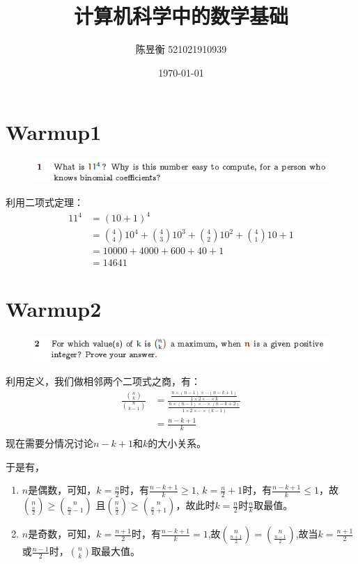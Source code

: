 \documentclass[]{article}
\title{计算机科学中的数学基础}
\author{陈昱衡 521021910939}
\date{\today}
\begin{document}
\maketitle


\section*{Warmup1}
\begin{figure}[H]
    \includegraphics[scale = 0.8]{2023-03-29-19-26-51.png}
\end{figure}
利用二项式定理：
\begin{align}
    11^4 &= (10+1)^4\\
    &=\binom{4}{4} 10^4 + \binom{4}{3}10^3 + \binom{4}{2} 10^2 + \binom{4}{1}10 + 1\\
    &=10000 + 4000 + 600 + 40 + 1\\
    &=14641
\end{align}


\section*{Warmup2}
\begin{figure}[H]
    \includegraphics[scale = 0.8]{2023-03-29-19-27-06.png}
\end{figure}
利用定义，我们做相邻两个二项式之商，有：
\begin{align}
    \frac{\binom{n}{k}}{\binom{n}{k-1}} &= \frac{\frac{n \times (n-1) \times \cdots (n - k + 1)}{1 \times 2 \times \cdots \times k}}{\frac{n \times (n-1) \times \cdots \times (n - k + 2)}{1 \times 2 \times \cdots \times (k-1)}}\\
    &=\frac{n-k+1}{k}\\
\end{align}
现在需要分情况讨论$n-k+1$和$k$的大小关系。\par 
于是有，
\begin{enumerate}
    \item $n$是偶数，可知，$k = \frac{n}{2}$时，有$\frac{ n - k +1}{k} \ge 1$, $k=\frac{n}{2} + 1$时，有$\frac{n-k+1}{k} \le 1$，故$\binom{n}{\frac{n}{2}} \ge \binom{n}{\frac{n}{2} - 1}$ 且$\binom{n}{\frac{n}{2}} \ge \binom{n}{\frac{n}{2} + 1}$，故此时$k = \frac{n}{2}$时$\frac{n}{k}$取最值。 
    \item $n$是奇数，可知，$k = \frac{n+1}{2}$时，有$\frac{n - k + 1}{k} = 1$,故$\binom{n}{\frac{n+1}{2}} = \binom{n}{\frac{n-1}{2}}$,故当$k = \frac{n+1}{2}$或$\frac{n-1}{2}$时，$\binom{n}{k}$取最大值。
\end{enumerate}
\end{document}
